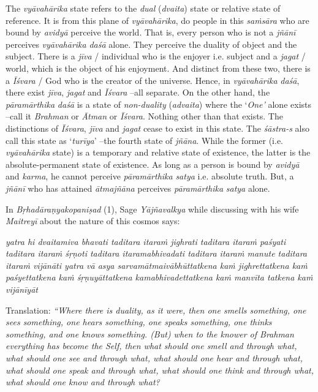 The \emph{vyāvahārika} state refers to the \emph{dual} (\emph{dvaita}) state or relative state of reference. It is from this plane of \emph{vyāvahārika}, do people in this \emph{saṁsāra} who are bound by \emph{avidyā} perceive the world. That is, every person who is not a \emph{jñānī} perceives \emph{vyāvahārika} \emph{daśā} alone. They perceive the duality of object and the subject. There is a \emph{jīva} / individual who is the enjoyer i.e. subject and a \emph{jagat} / world, which is the object of his enjoyment. And distinct from these two, there is a \emph{Īśvara} / God who is the creator of the universe. Hence, in \emph{vyāvahārika} \emph{daśā}, there exist \emph{jīva}, \emph{jagat} and \emph{Īśvara} --all separate. On the other hand, the \emph{pāramārthika} \emph{daśā} is a state of \emph{non-duality} (\emph{advaita}) where the `\emph{One'} alone exists --call it \emph{Brahman} or \emph{Ātman} or \emph{Īśvara}. Nothing other than that exists. The distinctions of \emph{Īśvara}, \emph{jīva} and \emph{jagat} cease to exist in this state. The \emph{śāstra-s} also call this state as `\emph{turīya}' --the fourth state of \emph{jñāna}. While the former (i.e. \emph{vyāvahārika} state) is a temporary and relative state of existence, the latter is the absolute-permanent state of existence. As long as a person is bound by \emph{avidyā} and \emph{karma}, he cannot perceive \emph{pāramārthika} \emph{satya} i.e. absolute truth. But, a \emph{jñānī} who has attained \emph{ātmajñāna} perceives \emph{pāramārthika} \emph{satya} alone.

In \emph{Bṛhadāraṇyakopaniṣad} (1), Sage \emph{Yājñavalkya} while discussing with his wife \emph{Maitreyī} about the nature of this cosmos says:

\emph{yatra hi dvaitamiva bhavati taditara itaraṁ jighrati taditara itaraṁ paśyati taditara itaraṁ śṛṇoti taditara itaramabhivadati taditara itaraṁ manute taditara itaraṁ vijānāti yatra vā asya sarvamātmaivābhūttatkena kaṁ jighrettatkena kaṁ paśyettatkena kaṁ śṛṇuyāttatkena kamabhivadettatkena kaṁ manvīta tatkena kaṁ vijānīyāt} 

Translation: \emph{``Where there is duality, as it were, then one smells something, one sees something, one hears something, one speaks something, one thinks something, and one knows something. (But) when to the knower of Brahman everything has become the Self, then what should one smell and through what, what should one see and through what, what should one hear and through what, what should one speak and through what, what should one think and through what, what should one know and through what?}

